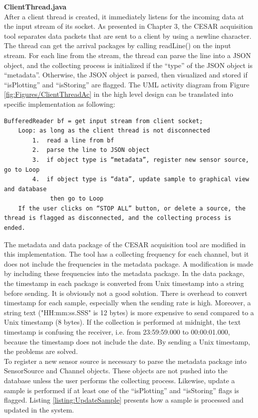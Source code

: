 \textbf{ClientThread.java}\\
After a client thread is created, it immediately listens for the incoming data at the input stream of its socket. As presented in Chapter 3, the CESAR acquisition tool separates data packets that are sent to a client by using a newline character. The thread can get the arrival packages by calling readLine() on the input stream. For each line from the stream, the thread can parse the line into a JSON object, and the collecting process is initialized if the “type” of the JSON object is “metadata”. Otherwise, the JSON object is parsed, then visualized and stored if “isPlotting” and “isStoring” are flagged. The UML activity diagram from Figure \ref{fig:Figures/ClientThreadAc} in the high level design can be translated into specific implementation as following:
\begin{lstlisting}[caption={Pseudo code to parse packets}, label = {listing:PseudoParsePackets}, captionpos=b]
	BufferedReader bf = get input stream from client socket;
	Loop: as long as the client thread is not disconnected
		1.  read a line from bf
		2.  parse the line to JSON object
		3.  if object type is “metadata”, register new sensor source, go to Loop
		4.  if object type is “data”, update sample to graphical view and database
		     then go to Loop
	If the user clicks on “STOP ALL” button, or delete a source, the thread is flagged as disconnected, and the collecting process is ended.
\end{lstlisting}
The metadata and data package of the CESAR acquisition tool are modified in this implementation. The tool has a collecting frequency for each channel, but it does not include the frequencies in the metadata package. A modification is made by including these frequencies into the metadata package. In the data package, the timestamp in each package is converted from Unix timestamp into a string before sending. It is obviously not a good solution. There is overhead to convert timestamp for each sample, especially when the sending rate is high. Moreover, a string text ("HH:mm:ss.SSS" is 12 bytes) is more expensive to send compared to a Unix timestamp (8 bytes). If the collection is performed at midnight, the text timestamp is confusing the receiver, i.e. from 23:59:59.000 to 00:00:01.000, because the timestamp does not include the date. By sending a Unix timestamp, the problems are solved.\\
To register a new sensor source is necessary to parse the metadata package into SensorSource and Channel objects. These objects are not pushed into the database unless the user performs the collecting process. Likewise, update a sample is performed if at least one of the “isPlotting” and “isStoring” flags is flagged. Listing \ref{listing:UpdateSample} presents how a sample is processed and updated in the system.\\
